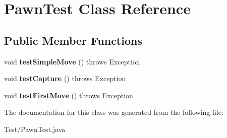 \hypertarget{class_pawn_test}{}\section{Pawn\+Test Class Reference}
\label{class_pawn_test}
\subsection*{Public Member Functions}
\begin{DoxyCompactItemize}
\item 
\hypertarget{class_pawn_test_a5fc5a41879f2e241700113fdf6f40395}{}void {\bfseries test\+Simple\+Move} ()  throws Exception \label{class_pawn_test_a5fc5a41879f2e241700113fdf6f40395}

\item 
\hypertarget{class_pawn_test_a844d85f5e8d5292b920a8367d94831b2}{}void {\bfseries test\+Capture} ()  throws Exception \label{class_pawn_test_a844d85f5e8d5292b920a8367d94831b2}

\item 
\hypertarget{class_pawn_test_aa70e6edb95a5d9f6776809fd1ba4abaf}{}void {\bfseries test\+First\+Move} ()  throws Exception \label{class_pawn_test_aa70e6edb95a5d9f6776809fd1ba4abaf}

\end{DoxyCompactItemize}


The documentation for this class was generated from the following file\+:\begin{DoxyCompactItemize}
\item 
Test/Pawn\+Test.\+java\end{DoxyCompactItemize}

